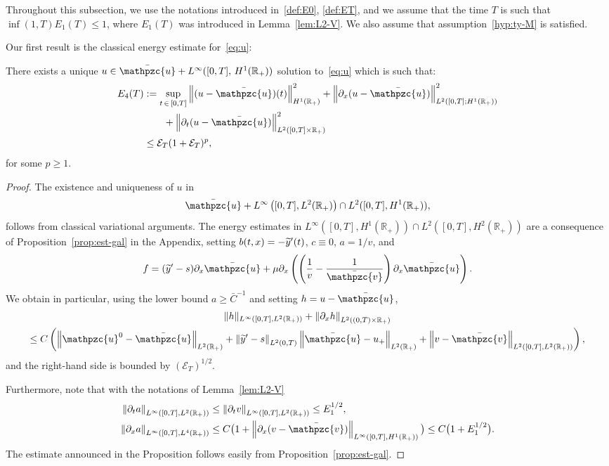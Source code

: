 \documentclass[AHL,Unicode,longabstracts,published]{cedram}
\newcommand{\R}{\mathbb{R}}
\newcommand{\p}{\partial}
\newcommand{\bv}{\bar{\mathpzc{v}}}
\newcommand{\bu}{\bar{\mathpzc{u}}}
\newcommand{\cE}{\mathcal E}
\newcommand{\tu}{\mathpzc{u}}
\newcommand{\ty}{\widetilde{y}}
\let\oldtilde\tilde
\renewcommand*{\tilde}[1]{\mathchoice{\widetilde{#1}}{\widetilde{#1}}{\oldtilde{#1}}{\oldtilde{#1}}}
\begin{document}
Throughout this subsection, we use the notations introduced in~\eqref{def:E0}, \eqref{def:ET}, and we assume that the time $T$ is such that $\inf(1,T) E_1(T) \leq 1$, where $E_1(T)$ was introduced in Lemma~\ref{lem:L2-V}. We also assume that assumption~\eqref{hyp:ty-M} is satisfied.


Our first result is the classical energy estimate for~\eqref{eq:u}:

\begin{lemm}\label{lem:u-1}
There exists a unique $u \in \bu + L^\infty([0,T],\,H^1(\R_+))$ solution to~\eqref{eq:u} which is such that:
\begin{align}
E_4(T)&:= \sup_{t\,\in\,[0,T]}\left\|(u-\bu)(t)\right\|_{H^1(\R_+)}^2 + \left\|\partial_x (u-\bu)\right\|_{L^2\left([0,T];H^1(\R_+)\right)}^2\\
&\qquad+ \left\|\partial_t (u-\bu)\right\|_{L^2\left([0,T]\times\R_+\right)}^2 \nonumber \\
&\leq \cE_T(1+ \cE_T)^{p},
\end{align}
for some $p\geq 1$.
\end{lemm}

\begin{proof}
The existence and uniqueness of $u$ in
\[
\bu+L^\infty\left([0,T], L^2(\R_+)\right)\cap L^2([0,T], H^1(\R_+)),
\]
follows from classical variational arguments. The energy estimates in $L^\infty([0,T], H^1(\R_+))\cap L^2([0,T], H^2(\R_+))$ are a consequence of Proposition~\ref{prop:est-gal} in the Appendix, setting $b(t,x)=-\tilde y'(t)$, $c\equiv 0$, $a=1/v$, and
\[
f= (\ty'-s)\p_x \bu + \mu \p_x\left(\left(\frac{1}{v}-\frac{1}{\bv}\right) \p_x \bu\right).
\]
We obtain in particular, using the lower bound $a\geq \bar C^{-1}$ and setting $h=u-\bu$,
\begin{multline}\label{eq:energy-u}
\|h\|_{L^\infty\left([0,T], L^2(\R_+)\right)} + \left\| \p_xh\right\|_{L^2\left((0,T)\times\R_+\right) }\\
 \leq C\left(\left\|\tu^0-\bu\right\|_{L^2(\R_+)} + \left\|\ty'-s\right\|_{L^2(0,T)}\left\|\bu-u_+\right\|_{L^2(\R_+)} + \left\|v-\bv\right\|_{L^2\left([0,T], L^2(\R_+)\right)}\right),
\end{multline}
and the right-hand side is bounded by $(\cE_T)^{1/2}$.

Furthermore, note that with the notations of Lemma~\ref{lem:L2-V}
\begin{align*}
\left\|\p_t a\right\|_{L^\infty\left([0,T], L^2(\R_+)\right)}&\leq \left\|\p_t v\right\|_{L^\infty\left([0,T], L^2(\R_+)\right)}\leq E_1^{1/2},\\
\left\|\p_x a\right\|_{L^\infty\left([0,T], L^4(\R_+)\right)} &\leq C\big(1 + \left\|\p_x (v -\bv) \right\|_{L^\infty\left([0,T], H^1(\R_+)\right)}\big)\leq C\big(1+ E_1^{1/2}\big).
\end{align*}
The estimate announced in the Proposition follows easily from Proposition~\ref{prop:est-gal}.
\end{proof}
\end{document}
